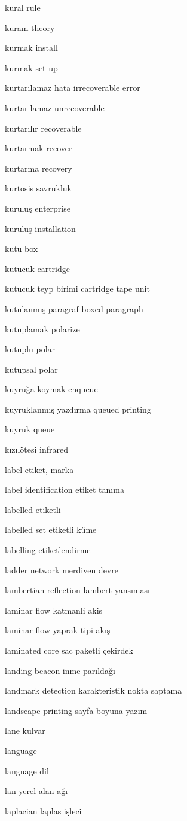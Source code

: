 \documentclass[12pt,fleqn]{article}\usepackage{../../common}
\begin{document}
kural rule

kuram theory

kurmak install

kurmak set up

kurtarılamaz hata irrecoverable error

kurtarılamaz unrecoverable

kurtarılır recoverable

kurtarmak recover

kurtarma recovery

kurtosis savrukluk

kuruluş enterprise

kuruluş installation

kutu box

kutucuk cartridge

kutucuk teyp birimi cartridge tape unit

kutulanmış paragraf boxed paragraph

kutuplamak polarize

kutuplu polar

kutupsal polar

kuyruğa koymak enqueue

kuyruklanmış yazdırma queued printing

kuyruk queue

kızılötesi infrared

label etiket, marka

label identification etiket tanıma

labelled etiketli

labelled set etiketli küme

labelling etiketlendirme

ladder network merdiven devre

lambertian reflection lambert yansıması

laminar flow katmanli akis

laminar flow yaprak tipi akış

laminated core sac paketli çekirdek

landing beacon inme parıldağı

landmark detection karakteristik nokta saptama

landscape printing sayfa boyuna yazım

lane kulvar

language

language dil

lan yerel alan ağı

laplacian laplas işleci
\end{document}
